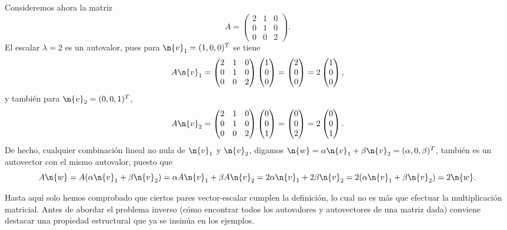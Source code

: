 Consideremos ahora la matriz 
\[
A = \begin{pmatrix} 2 & 1 & 0 \\ 0 & 1 & 0 \\ 0 & 0 & 2 \end{pmatrix}.
\]
El escalar $\lambda=2$ es un autovalor, pues para $\n{v}_1 = (1,0,0)^T$ se tiene
\[
A \n{v}_1 = \begin{pmatrix} 2 & 1 & 0 \\ 0 & 1 & 0 \\ 0 & 0 & 2 \end{pmatrix} \begin{pmatrix} 1 \\ 0 \\ 0 \end{pmatrix} = \begin{pmatrix} 2 \\ 0 \\ 0 \end{pmatrix} = 2 \begin{pmatrix} 1 \\ 0 \\ 0 \end{pmatrix},
\]
y también para $\n{v}_2 = (0,0,1)^T$,
\[
A \n{v}_2 = \begin{pmatrix} 2 & 1 & 0 \\ 0 & 1 & 0 \\ 0 & 0 & 2 \end{pmatrix} \begin{pmatrix} 0 \\ 0 \\ 1 \end{pmatrix} = \begin{pmatrix} 0 \\ 0 \\ 2 \end{pmatrix} = 2 \begin{pmatrix} 0 \\ 0 \\ 1 \end{pmatrix}.
\]
De hecho, cualquier combinación lineal no nula de $\n{v}_1$ y $\n{v}_2$, digamos $\n{w} = \alpha \n{v}_1 + \beta \n{v}_2 = (\alpha, 0, \beta)^T$, también es un autovector con el mismo autovalor, puesto que
\[
A \n{w} = A(\alpha \n{v}_1 + \beta \n{v}_2) = \alpha A \n{v}_1 + \beta A \n{v}_2 = 2\alpha \n{v}_1 + 2\beta \n{v}_2 = 2(\alpha \n{v}_1 + \beta \n{v}_2) = 2\n{w}.
\]

Hasta aquí solo hemos comprobado que ciertos pares vector-escalar cumplen la definición, lo cual no es más que efectuar la multiplicación matricial. Antes de abordar el problema inverso (cómo encontrar todos los autovalores y autovectores de una matriz dada) conviene destacar una propiedad estructural que ya se insinúa en los ejemplos.

